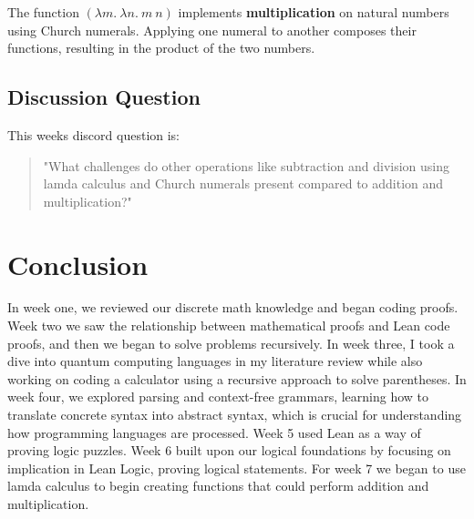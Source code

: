 \documentclass{article}
\begin{document}
The function \((\lambda m.\ \lambda n.\ m\ n)\) implements \textbf{multiplication} on natural numbers using Church numerals. Applying one numeral to another composes their functions, resulting in the product of the two numbers.

\subsection*{Discussion Question}

This weeks discord question is:

\begin{quote}
\small
"What challenges do other operations like subtraction and division using lamda calculus and Church numerals present compared to addition and multiplication?"
\end{quote}

\section*{Conclusion}
In week one, we reviewed our discrete math knowledge and began coding proofs. Week two we saw the relationship between mathematical proofs and Lean code proofs, and then we began to solve problems recursively. In week three, I took a dive into quantum computing languages in my literature review while also working on coding a calculator using a recursive approach to solve parentheses. In week four, we explored parsing and context-free grammars, learning how to translate concrete syntax into abstract syntax, which is crucial for understanding how programming languages are processed. Week 5 used Lean as a way of proving logic puzzles. Week 6 built upon our logical foundations by focusing on implication in Lean Logic, proving logical statements. For week 7 we began to use lamda calculus to begin creating functions that could perform addition and multiplication.
\end{document}
